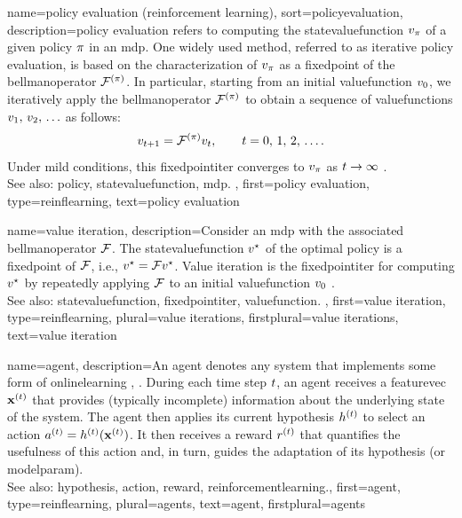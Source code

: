 {name={policy evaluation (reinforcement learning)},
sort={policyevaluation},
	description={\Gls{policy} evaluation refers to computing 
		the \gls{statevaluefunction} $v_{\pi}$ 
		of a given \gls{policy} $\pi$ in an \gls{mdp}. One widely used method, referred to 
		as iterative \gls{policy} evaluation, is based on the characterization of 
		$v_{\pi}$ as a \gls{fixedpoint} of the \gls{bellmanoperator} 
		$\mathcal{F}^{(\pi)}$. In particular, starting from an initial 
		\gls{valuefunction} $v_{0}$, we iteratively apply the \gls{bellmanoperator}
		$\mathcal{F}^{(\pi)}$ to obtain a \gls{sequence} of \glspl{valuefunction} 
		$v_{1}, \,v_{2}, \,\ldots$ as follows:
		\[
		v_{t+1} = \mathcal{F}^{(\pi)} v_{t}, \qquad t=0,\,1,\,2,\,\ldots.
		\]
		Under mild conditions, this \gls{fixedpointiter} converges to 
		$v_{\pi}$ as $t \rightarrow \infty$ \cite[Sec. 4.2]{SuttonEd2}.
		\\
		See also: \gls{policy}, \gls{statevaluefunction}, \gls{mdp}. }, 
	first={policy evaluation},
	type=reinflearning,
	text={policy evaluation}	 
}

{name={value iteration},
	description={Consider an \gls{mdp} with the associated \gls{bellmanoperator} $\mathcal{F}$. The 
		\gls{statevaluefunction} $v^\star$ of the optimal \gls{policy} 
		is a \gls{fixedpoint} of $\mathcal{F}$, i.e., $v^\star = \mathcal{F} v^\star$. 
		Value \gls{iteration} is the \gls{fixedpointiter} for computing
		$v^\star$ by repeatedly applying $\mathcal{F}$ to an initial 
		\gls{valuefunction} $v_{0}$ \cite[Sec. 4.4]{SuttonEd2}.
		\\
		See also: \gls{statevaluefunction}, \gls{fixedpointiter}, \gls{valuefunction}. }, 
	first={value iteration},
	type=reinflearning,
	plural={value iterations},
	firstplural={value iterations},
	text={value iteration} 
}

{name={agent},
	description={An agent denotes any system that implements some form of 
		\gls{onlinelearning} \cite{SuttonEd2}, \cite{RusselNorvig}. During each time 
		step $t$, an agent receives a \gls{featurevec} ${\bf x}^{(t)}$ 
		that provides (typically incomplete) information about the underlying \gls{state} 
		of the system. The agent then applies its current \gls{hypothesis} $h^{(t)}$ to select 
		an \gls{action} $a^{(t)}=h^{(t)}({\bf x}^{(t)})$. 
		It then receives a \gls{reward} $r^{(t)}$ that quantifies the usefulness of this \gls{action} 
		and, in turn, guides the adaptation of its \gls{hypothesis} (or \gls{modelparam}). 
		\\ 
		See also: \gls{hypothesis}, \gls{action}, \gls{reward}, \gls{reinforcementlearning}.},
	first={agent},
	type=reinflearning, 
	plural={agents}, 
	text={agent},
	firstplural={agents}
 }

